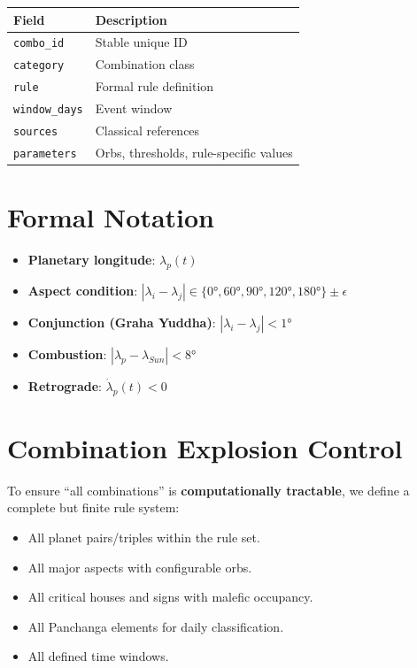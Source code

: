 \documentclass[
  11pt,
  a4paper,
  oneside,
  openany]{report}
\providecommand{\tightlist}{%
  \setlength{\itemsep}{0pt}\setlength{\parskip}{0pt}}\usepackage{longtable,booktabs,array}
\begin{document}
\begin{longtable}[]{@{}ll@{}}
\toprule\noalign{}
Field & Description \\
\midrule\noalign{}
\endhead
\bottomrule\noalign{}
\endlastfoot
\texttt{combo\_id} & Stable unique ID \\
\texttt{category} & Combination class \\
\texttt{rule} & Formal rule definition \\
\texttt{window\_days} & Event window \\
\texttt{sources} & Classical references \\
\texttt{parameters} & Orbs, thresholds, rule-specific values \\
\end{longtable}

\section{Formal Notation}\label{formal-notation}

\begin{itemize}
\tightlist
\item
  \textbf{Planetary longitude}: \(\lambda_p(t)\)
\item
  \textbf{Aspect condition}:
  \(|\lambda_i - \lambda_j| \in \{0°, 60°, 90°, 120°, 180°\} \pm \epsilon\)
\item
  \textbf{Conjunction (Graha Yuddha)}: \(|\lambda_i - \lambda_j| < 1°\)
\item
  \textbf{Combustion}: \(|\lambda_p - \lambda_{Sun}| < 8°\)
\item
  \textbf{Retrograde}: \(\dot{\lambda}_p(t) < 0\)
\end{itemize}

\section{Combination Explosion
Control}\label{combination-explosion-control}

To ensure ``all combinations'' is \textbf{computationally tractable}, we
define a complete but finite rule system:

\begin{itemize}
\tightlist
\item
  All planet pairs/triples within the rule set.
\item
  All major aspects with configurable orbs.
\item
  All critical houses and signs with malefic occupancy.
\item
  All Panchanga elements for daily classification.
\item
  All defined time windows.
\end{itemize}
\end{document}
